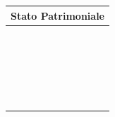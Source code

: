 \documentclass{article}
\begin{document}
\newpage
\begin{longtable}{|m{6cm}|m{0.5cm}|m{6cm}|m{0.5cm}|}
    \hline
    \multicolumn{4}{|c|}{\textbf{Stato Patrimoniale}} \\
    \hline
     &  &  &                                          \\
    \hline
     &  &  &                                          \\
    \hline
     &  &  &                                          \\
    \hline
     &  &  &                                          \\
    \hline
     &  &  &                                          \\
    \hline
     &  &  &                                          \\
    \hline
     &  &  &                                          \\
    \hline
     &  &  &                                          \\
    \hline
     &  &  &                                          \\
    \hline
     &  &  &                                          \\
    \hline
     &  &  &                                          \\
    \hline
     &  &  &                                          \\
    \hline
     &  &  &                                          \\
    \hline
     &  &  &                                          \\
    \hline
     &  &  &                                          \\
    \hline
     &  &  &                                          \\
    \hline
     &  &  &                                          \\
    \hline
     &  &  &                                          \\
    \hline
     &  &  &                                          \\
    \hline
     &  &  &                                          \\
    \hline
     &  &  &                                          \\
    \hline
     &  &  &                                          \\
    \hline
     &  &  &                                          \\

\end{longtable}
\end{document}
